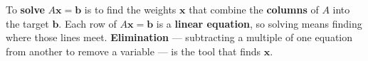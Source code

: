 \documentclass[10pt]{article}
\begin{document}
\vspace{0.10in}

\begin{remindbox}
\small To \textbf{solve} $A\mathbf{x}=\mathbf{b}$ is to find the weights $\mathbf{x}$ that combine
the \textbf{columns} of $A$ into the target $\mathbf{b}$. Each row of $A\mathbf{x}=\mathbf{b}$ is a
\textbf{linear equation}, so solving means finding where those lines meet.
\textbf{Elimination} --- subtracting a multiple of one equation from another to remove a
variable --- is the tool that finds $\mathbf{x}$.
\end{remindbox}
\end{document}
